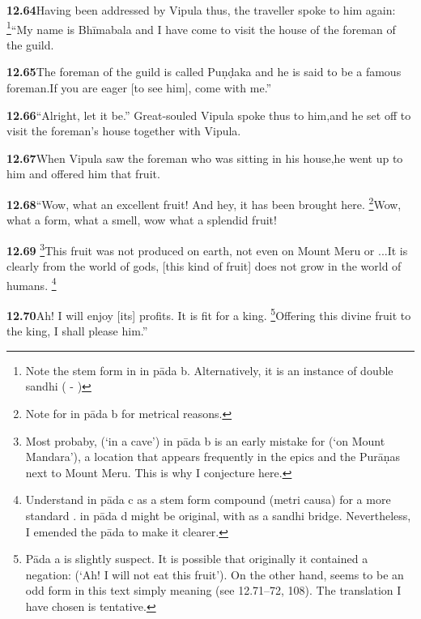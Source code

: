 \textbf{12.64}Having been addressed by Vipula thus, the traveller spoke to him again:%
\footnote{Note the stem form  in  in pāda b. Alternatively,               it is an instance of double sandhi ( - )  }``My name is Bhīmabala and I have come to visit the house of the foreman of the guild.%


\textbf{12.65}The foreman of the guild is called Puṇḍaka and he is said to be a famous foreman.If you are eager [to see him], come with me.''%


\textbf{12.66}``Alright, let it be.'' Great-souled Vipula spoke thus to him,and he set off to visit the foreman's house together with Vipula.%


\textbf{12.67}When Vipula saw the foreman who was sitting in his house,he went up to him and offered him that fruit.%


\textbf{12.68}``Wow, what an excellent fruit! And hey, it has been brought here.%
\footnote{Note  for  in pāda b for metrical reasons.  }Wow, what a form, what a smell, wow what a splendid fruit!%


\textbf{12.69}%
\footnote{Most probaby,  (`in a cave') in pāda b is an early                  mistake for  (`on Mount Mandara'), a location that                  appears frequently in the epics and the Purāṇas next                  to Mount Meru. This is why I conjecture  here.  }This fruit was not produced on earth, not even on Mount Meru or ...It is clearly from the world of gods, [this kind of fruit] does not grow in                        the world of humans.%
\footnote{Understand  in pāda c as a stem form compound (metri causa) for a more standard               .                in pāda d might be original, with  as a sandhi bridge. Nevertheless,               I emended the pāda to make it clearer.  }%


\textbf{12.70}Ah! I will enjoy [its] profits. It is fit for a king.%
\footnote{Pāda a is slightly suspect. It is possible that originally it contained a                negation:  (`Ah! I will not eat this fruit').               On the other hand,  seems to be an odd form in this text simply               meaning  (see 12.71--72, 108).               The translation I have chosen is tentative.  }Offering this divine fruit to the king, I shall please him.''%


